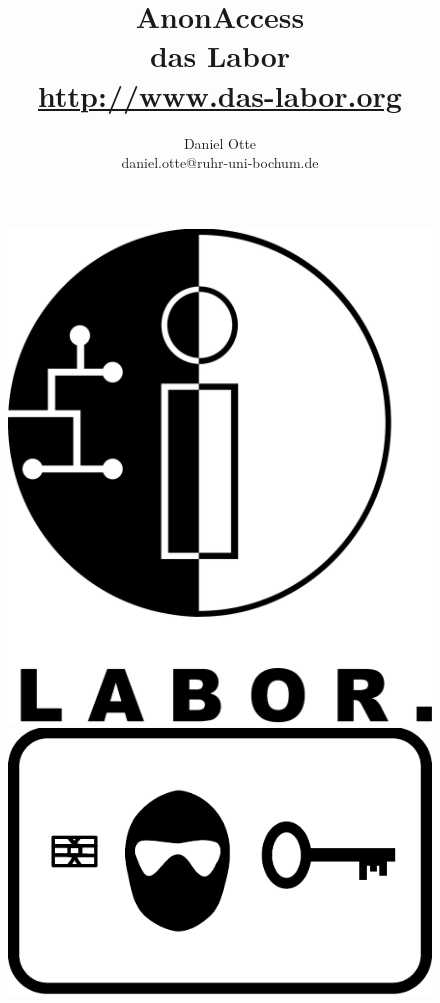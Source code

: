 \documentclass[10pt,a4paper]{article}
\author{Daniel Otte\\daniel.otte@ruhr-uni-bochum.de}
\title{\Huge{\textsf{AnonAccess}} \\ \normalsize{das Labor \\ \url{http://www.das-labor.org}}}
\begin{document}
 

\begin{figure}[t]
 \begin{minipage}[b]{.3\linewidth}
 \includegraphics[scale=0.15]{Labor} 
 \end{minipage}
 \hspace{0.5\linewidth}
 \begin{minipage}[b]{.3\linewidth}
 \includegraphics[scale=0.7]{AnonAccessLogo} 
 \end{minipage}
\end{figure}
\end{document}
